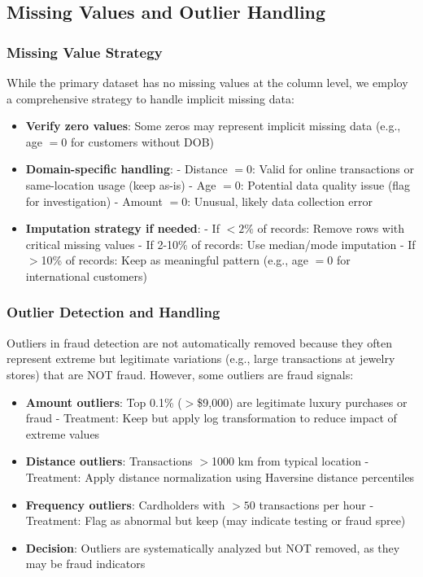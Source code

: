 \subsection{Missing Values and Outlier Handling}

\subsubsection{Missing Value Strategy}

While the primary dataset has no missing values at the column level, we employ a comprehensive strategy to handle implicit missing data:

\begin{itemize}
    \item \textbf{Verify zero values}: Some zeros may represent implicit missing data (e.g., age $= 0$ for customers without DOB)
    \item \textbf{Domain-specific handling}:
        - Distance $= 0$: Valid for online transactions or same-location usage (keep as-is)
        - Age $= 0$: Potential data quality issue (flag for investigation)
        - Amount $= 0$: Unusual, likely data collection error
    \item \textbf{Imputation strategy if needed}:
        - If $<2\%$ of records: Remove rows with critical missing values
        - If 2-10\% of records: Use median/mode imputation
        - If $>$10\% of records: Keep as meaningful pattern (e.g., age $= 0$ for international customers)
\end{itemize}

\subsubsection{Outlier Detection and Handling}

Outliers in fraud detection are not automatically removed because they often represent extreme but legitimate variations (e.g., large transactions at jewelry stores) that are NOT fraud. However, some outliers are fraud signals:

\begin{itemize}
    \item \textbf{Amount outliers}: Top 0.1\% ($>$\$9,000) are legitimate luxury purchases or fraud
        - Treatment: Keep but apply log transformation to reduce impact of extreme values
    \item \textbf{Distance outliers}: Transactions $>$1000 km from typical location
        - Treatment: Apply distance normalization using Haversine distance percentiles
    \item \textbf{Frequency outliers}: Cardholders with $>50$ transactions per hour
        - Treatment: Flag as abnormal but keep (may indicate testing or fraud spree)
    \item \textbf{Decision}: Outliers are systematically analyzed but NOT removed, as they may be fraud indicators
\end{itemize}

